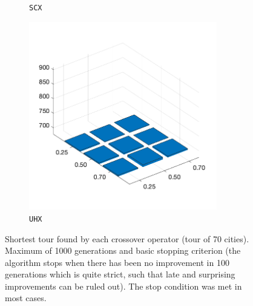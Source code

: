 \begin{figure}[H]
\begin{subfigure}[b]{0.25\textwidth}
		\caption{\texttt{SCX}}
		\label{fig:y}
    	\end{subfigure}
%
	\begin{subfigure}[b]{0.25\textwidth}
		\centering
		\includegraphics[width=0.9\textwidth]{crossover/min/cross_unnamed_1.png}
		\caption{\texttt{UHX}}
		\label{fig:z}
    	\end{subfigure}
	\caption{Shortest tour found by each crossover operator (tour of 70 cities). Maximum of 1000 generations and basic stopping criterion (the algorithm stops when there has been no improvement in 100 generations which is quite strict, such that late and surprising improvements can be ruled out). The stop condition was met in most cases.}
	\label{fig:rescross1}
\end{figure}


